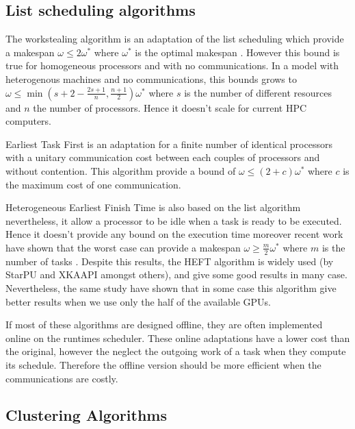 \documentclass[10pt, conference, compsocconf]{IEEEtran}
\begin{document}
\subsection{List scheduling algorithms}

The workstealing algorithm is an adaptation of the list scheduling which
provide a makespan $\omega\leq2\omega^*$ where $\omega^*$ is the optimal
makespan \cite{GrahamRL1966Bounds, GrahamRL1969Bounds}. However this bound is
true for homogeneous processors and with no communications. In a model with
heterogenous machines and no communications, this bounds grows to
$\omega\leq\min(s+2-\frac{2s+1}{n},\frac{n+1}{2})\omega^*$ where $s$ is the
number of different resources and $n$ the number of processors. Hence it
doesn't scale for current HPC computers. 

Earliest Task First\cite{hwang1989scheduling} is an adaptation for a finite
number of identical processors with a unitary communication cost between each
couples of processors and without contention.  This algorithm provide a bound
of $\omega\leq(2+c)\omega^*$ where $c$ is the maximum cost of one
communication.  

Heterogeneous Earliest Finish Time \cite{topcuoglu2002performance} is also
based on the list algorithm nevertheless, it allow a processor to be idle when
a task is ready to be executed. 
Hence it doesn't provide any bound on the
execution time moreover recent work have shown that the worst case can provide
a makespan $\omega \geq \frac{m}{2}\omega^*$ where $m$ is the number of tasks
\cite{Kedad-SidhoumMonnaMounieEtAl2013}. Despite this results, the HEFT
algorithm is widely used (by StarPU and XKAAPI amongst others), and give some
good results in many case\cite{ferreiralima:hal-00735470}. Nevertheless, the
same study have shown that in some case this algorithm give better results
when we use only the half of the available GPUs.

If most of these algorithms are designed offline, they are often implemented
online on the runtimes scheduler. These online adaptations have a lower cost
than the original, however the neglect the outgoing work of a task when they
compute its schedule. Therefore the offline version should be more efficient
when the communications are costly.

\subsection{Clustering Algorithms}
\end{document}
